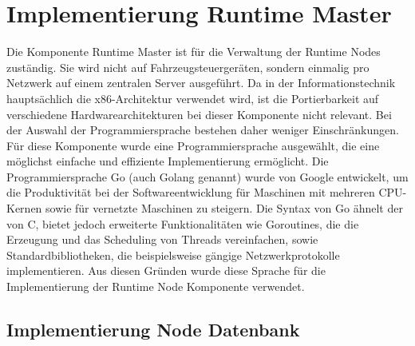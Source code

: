 \section{Implementierung Runtime Master}

Die Komponente Runtime Master ist für die Verwaltung der Runtime Nodes zuständig. Sie wird nicht auf Fahrzeugsteuergeräten, sondern einmalig pro Netzwerk auf einem zentralen Server ausgeführt. Da in der Informationstechnik hauptsächlich die x86-Architektur verwendet wird, ist die Portierbarkeit auf verschiedene Hardwarearchitekturen bei dieser Komponente nicht relevant. Bei der Auswahl der Programmiersprache bestehen daher weniger Einschränkungen. Für diese Komponente wurde eine Programmiersprache ausgewählt, die eine möglichst einfache und effiziente Implementierung ermöglicht. Die Programmiersprache Go (auch Golang genannt) wurde von Google entwickelt, um die Produktivität bei der Softwareentwicklung für Maschinen mit mehreren CPU-Kernen sowie für vernetzte Maschinen zu steigern. Die Syntax von Go ähnelt der von C, bietet jedoch erweiterte Funktionalitäten wie Goroutines, die die Erzeugung und das Scheduling von Threads vereinfachen, sowie Standardbibliotheken, die beispielsweise gängige Netzwerkprotokolle implementieren. Aus diesen Gründen wurde diese Sprache für die Implementierung der Runtime Node Komponente verwendet. 

\subsection{Implementierung Node Datenbank}

